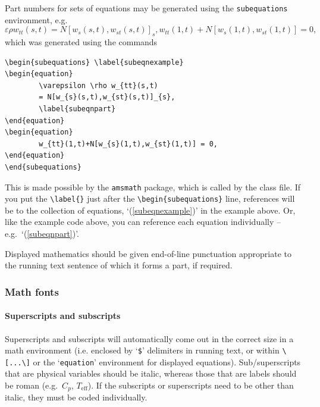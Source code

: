 \documentclass[]{interact}
\theoremstyle{plain}%
\theoremstyle{definition}
\theoremstyle{remark}
\begin{document}
Part numbers for sets of equations may be generated using the \texttt{subequations} environment, e.g.
\begin{subequations} \label{subeqnexample}
\begin{equation}
        \varepsilon \rho w_{tt}(s,t)
        = N[w_{s}(s,t),w_{st}(s,t)]_{s},
        \label{subeqnpart}
\end{equation}
\begin{equation}
        w_{tt}(1,t)+N[w_{s}(1,t),w_{st}(1,t)] = 0,
\end{equation}
\end{subequations}
which was generated using the commands
\begin{verbatim}
\begin{subequations} \label{subeqnexample}
\begin{equation}
        \varepsilon \rho w_{tt}(s,t)
        = N[w_{s}(s,t),w_{st}(s,t)]_{s},
        \label{subeqnpart}
\end{equation}
\begin{equation}
        w_{tt}(1,t)+N[w_{s}(1,t),w_{st}(1,t)] = 0,
\end{equation}
\end{subequations}
\end{verbatim}
This is made possible by the \texttt{amsmath} package, which is called by the class file. If you put the \verb"\label{}" just after the \verb"\begin{subequations}" line, references will be to the collection of equations, `(\ref{subeqnexample})' in the example above. Or, like the example code above, you can reference each equation individually -- e.g.\ `(\ref{subeqnpart})'.

Displayed mathematics should be given end-of-line punctuation appropriate to the running text sentence of which it forms a part, if required.

\subsubsection{Math fonts}

\paragraph{Superscripts and subscripts}
Superscripts and subscripts will automatically come out in the correct size in a math environment (i.e. enclosed by `\verb"$"' delimiters in running text, or within \verb"\[...\]" or the `\texttt{equation}' environment for displayed equations). Sub/superscripts that are physical variables should be italic, whereas those that are labels should be roman (e.g.\ $C_p$, $T_\mathrm{eff}$). If the subscripts or superscripts need to be other than italic, they must be coded individually.
\end{document}
